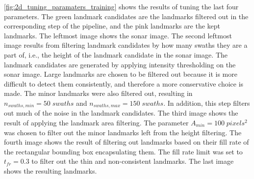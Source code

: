 \cref{fig:2d_tuning_paramaters_training} shows the results of tuning the last four parameters. The green landmark candidates are the landmarks filtered out in the corresponding step of the pipeline, and the pink landmarks are the kept landmarks. The leftmost image shows the sonar image. The second leftmost image results from filtering landmark candidates by how many swaths they are a part of, i.e., the height of the landmark candidate in the sonar image. The landmark candidates are generated by applying intensity thresholding on the sonar image. Large landmarks are chosen to be filtered out because it is more difficult to detect them consistently, and therefore a more conservative choice is made. The minor landmarks were also filtered out, resulting in $n_{swaths, min} = 50 \; swaths$ and $n_{swaths, max} = 150 \; swaths$. In addition, this step filters out much of the noise in the landmark candidates. The third image shows the result of applying the landmark area filtering. The parameter $A_{min} = 100 \;pixels^2$ was chosen to filter out the minor landmarks left from the height filtering. The fourth image shows the result of filtering out landmarks based on their fill rate of the rectangular bounding box encapsulating them. The fill rate limit was set to $t_{fr} = 0.3$ to filter out the thin and non-consistent landmarks. The last image shows the resulting landmarks.

